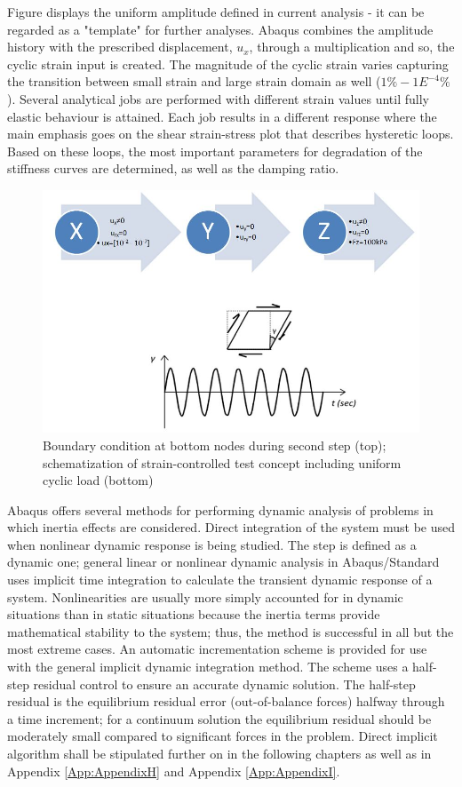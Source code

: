 \documentclass[11pt,a4paper]{report}
\begin{document}
Figure \label{Figure 16} displays the uniform amplitude defined in current analysis - it can be regarded as a "template" for further analyses. Abaqus combines the amplitude history with the prescribed displacement, $u_x$, through a multiplication and so, the cyclic strain input is created. The magnitude of the cyclic strain varies capturing the transition between small strain and large strain domain as well ($1\% -  1E^{-4}\%$). Several analytical jobs are performed with different strain values until fully elastic behaviour is attained. Each job results in a different response where the main emphasis goes on the shear strain-stress plot that describes hysteretic loops. Based on these loops, the most important parameters for degradation of the stiffness curves are determined, as well as the damping ratio.
\begin{figure}[h!]
	\centering
	\includegraphics[width=0.7\linewidth]{"bc1d2"}
	\caption{Boundary condition at bottom nodes during second step (top); schematization of strain-controlled test concept including uniform cyclic load (bottom)}
	\label{strain-test}
\end{figure}

Abaqus offers several methods for performing dynamic analysis of problems in which inertia effects are considered. Direct integration of the system must be used when nonlinear dynamic response is being studied. The step is defined as a dynamic one; general linear or nonlinear dynamic analysis in Abaqus/Standard uses implicit time integration to calculate the transient dynamic response of a system. Nonlinearities are usually more simply accounted for in dynamic situations than in static situations because the inertia terms provide mathematical stability to the system; thus, the method is successful in all but the most extreme cases. An automatic incrementation scheme is provided for use with the general implicit dynamic integration method. The scheme uses a half-step residual control to ensure an accurate dynamic solution. The half-step residual is the equilibrium residual error (out-of-balance forces) halfway through a time increment; for a continuum solution the equilibrium residual should be moderately small compared to significant forces in the problem.
Direct implicit algorithm shall be stipulated further on in the following chapters as well as in Appendix \ref{App:AppendixH} and Appendix \ref{App:AppendixI}.
\newpage
\end{document}
